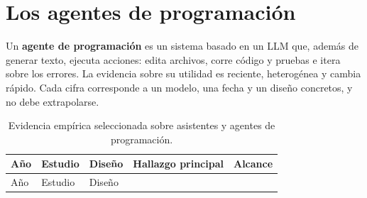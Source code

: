 \documentclass[11pt,a4paper]{article}
\begin{document}
\section{Los agentes de programación}\label{sec-agentes}

Un \textbf{agente de programación} es un sistema basado en un LLM que, además de generar texto, ejecuta acciones: edita archivos, corre código y pruebas e itera sobre los errores. La evidencia sobre su utilidad es reciente, heterogénea y cambia rápido. Cada cifra corresponde a un modelo, una fecha y un diseño concretos, y no debe extrapolarse.

\begingroup\small
\begin{longtable}[]{@{}
  >{\raggedright\arraybackslash}p{}
  >{\raggedright\arraybackslash}p{}
  >{\raggedright\arraybackslash}p{}
  >{\raggedright\arraybackslash}p{}
  >{\raggedright\arraybackslash}p{}@{}}
\caption{Evidencia empírica seleccionada sobre asistentes y agentes de programación.}\label{tbl-agentes}\tabularnewline
\toprule\noalign{}
\begin{minipage}[b]{\linewidth}\raggedright
Año
\end{minipage} & \begin{minipage}[b]{\linewidth}\raggedright
Estudio
\end{minipage} & \begin{minipage}[b]{\linewidth}\raggedright
Diseño
\end{minipage} & \begin{minipage}[b]{\linewidth}\raggedright
Hallazgo principal
\end{minipage} & \begin{minipage}[b]{\linewidth}\raggedright
Alcance
\end{minipage} \\
\midrule\noalign{}
\endfirsthead
\toprule\noalign{}
\begin{minipage}[b]{\linewidth}\raggedright
Año
\end{minipage} & \begin{minipage}[b]{\linewidth}\raggedright
Estudio
\end{minipage} & \begin{minipage}[b]{\linewidth}\raggedright
Diseño
\end{minipage} & \begin{minipage}[b]{\linewidth}\raggedright

\end{minipage}
\end{longtable}
\end{document}
